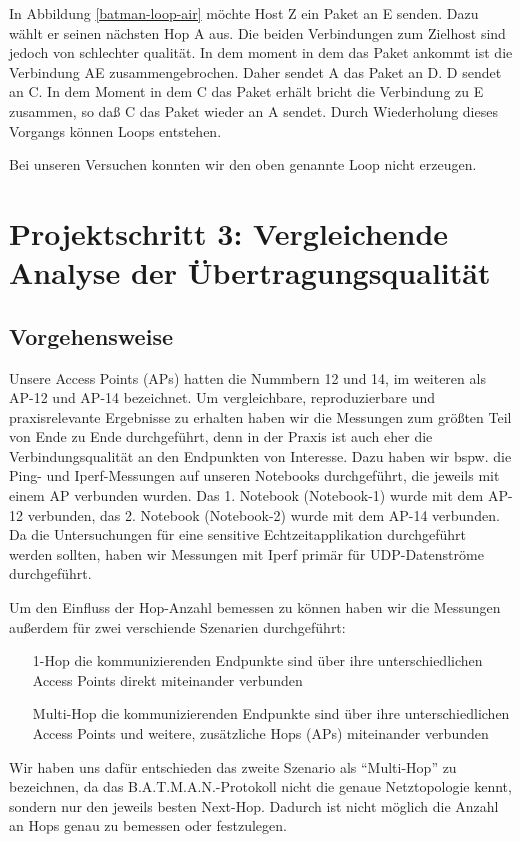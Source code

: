 \documentclass[a4paper,10pt]{article}
\begin{document}
In Abbildung \ref{batman-loop-air} möchte Host Z ein Paket an E senden. Dazu wählt er seinen nächsten Hop A aus.
Die beiden Verbindungen zum Zielhost sind jedoch von schlechter qualität.
In dem moment in dem das Paket ankommt ist die Verbindung AE zusammengebrochen.
Daher sendet A das Paket an D.
D sendet an C.
In dem Moment in dem C das Paket erhält bricht die Verbindung zu E zusammen, so daß C das Paket wieder an A sendet.
Durch Wiederholung dieses Vorgangs können Loops entstehen.

Bei unseren Versuchen konnten wir den oben genannte Loop nicht erzeugen.

\section{Projektschritt 3: Vergleichende Analyse der Übertragungsqualität}

\subsection{Vorgehensweise}

Unsere Access Points (APs) hatten die Nummbern 12 und 14, im weiteren als AP-12 und AP-14 bezeichnet.
Um vergleichbare, reproduzierbare und praxisrelevante Ergebnisse zu erhalten haben wir die Messungen zum größten Teil von Ende zu Ende durchgeführt, denn in der Praxis ist auch eher die Verbindungsqualität an den Endpunkten von Interesse.
Dazu haben wir bspw. die Ping- und Iperf-Messungen auf unseren Notebooks durchgeführt, die jeweils mit einem AP verbunden wurden.
Das 1. Notebook (Notebook-1) wurde mit dem AP-12 verbunden, das 2. Notebook (Notebook-2) wurde mit dem AP-14 verbunden.
Da die Untersuchungen für eine sensitive Echtzeitapplikation durchgeführt werden sollten, haben wir Messungen mit Iperf primär für UDP-Datenströme durchgeführt.

Um den Einfluss der Hop-Anzahl bemessen zu können haben wir die Messungen außerdem für zwei verschiende Szenarien durchgeführt:
\begin{itemize}
  \item[1-Hop] die kommunizierenden Endpunkte sind über ihre unterschiedlichen Access Points direkt miteinander verbunden 
  \item[Multi-Hop] die kommunizierenden Endpunkte sind über ihre unterschiedlichen Access Points und weitere, zusätzliche Hops (APs) miteinander verbunden
\end{itemize}

Wir haben uns dafür entschieden das zweite Szenario als "`Multi-Hop"' zu bezeichnen, da das B.A.T.M.A.N.-Protokoll nicht die genaue Netztopologie kennt, sondern nur den jeweils besten Next-Hop.
Dadurch ist nicht möglich die Anzahl an Hops genau zu bemessen oder festzulegen.
\end{document}
